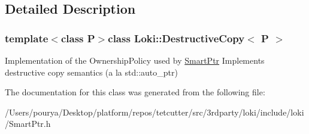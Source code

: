 \subsection{Detailed Description}
\subsubsection*{template$<$class P$>$class Loki\+::\+Destructive\+Copy$<$ P $>$}

Implementation of the Ownership\+Policy used by \hyperlink{classLoki_1_1SmartPtr}{Smart\+Ptr} Implements destructive copy semantics (a la std\+::auto\+\_\+ptr) 

The documentation for this class was generated from the following file\+:\begin{DoxyCompactItemize}
\item 
/\+Users/pourya/\+Desktop/platform/repos/tetcutter/src/3rdparty/loki/include/loki/Smart\+Ptr.\+h\end{DoxyCompactItemize}
